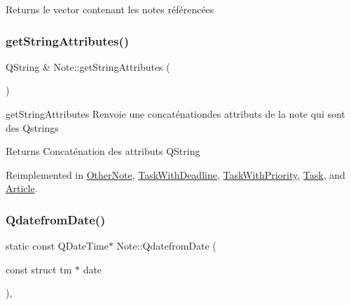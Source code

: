 \begin{DoxyReturn}{Returns}
le vector contenant les notes référencées 
\end{DoxyReturn}
\mbox{\label{classNote_a0ffff907bdb41b8c6a4abe62dfa3a2c1}} 
\subsubsection{\texorpdfstring{get\+String\+Attributes()}{getStringAttributes()}}
{\footnotesize\ttfamily Q\+String \& Note\+::get\+String\+Attributes (\begin{DoxyParamCaption}{ }\end{DoxyParamCaption})\hspace{0.3cm}{\ttfamily [virtual]}}



get\+String\+Attributes Renvoie une concaténationdes attributs de la note qui sont des Qstrings 

\begin{DoxyReturn}{Returns}
Concaténation des attributs Q\+String 
\end{DoxyReturn}


Reimplemented in \hyperlink{classOtherNote_a3f475cf0cfc1a9cd8785618c0a7f3496}{Other\+Note}, \hyperlink{classTaskWithDeadline_a2fda40b455e7eebb550b41edf451dfdb}{Task\+With\+Deadline}, \hyperlink{classTaskWithPriority_a8463ac90713f33e4e9ca04de18eebb8b}{Task\+With\+Priority}, \hyperlink{classTask_a410f65f8d06198e75d8faec574827726}{Task}, and \hyperlink{classArticle_aaddf8d9717ead08fce20be1052af82c9}{Article}.

\mbox{\label{classNote_ae970e7fb5ef01469aa488d8cdc8bdd57}} 
\subsubsection{\texorpdfstring{Qdatefrom\+Date()}{QdatefromDate()}}
{\footnotesize\ttfamily static const Q\+Date\+Time$\ast$ Note\+::\+Qdatefrom\+Date (\begin{DoxyParamCaption}\item[{const struct tm $\ast$}]{date }\end{DoxyParamCaption})\hspace{0.3cm}{\ttfamily [inline]}, {\ttfamily [static]}}



